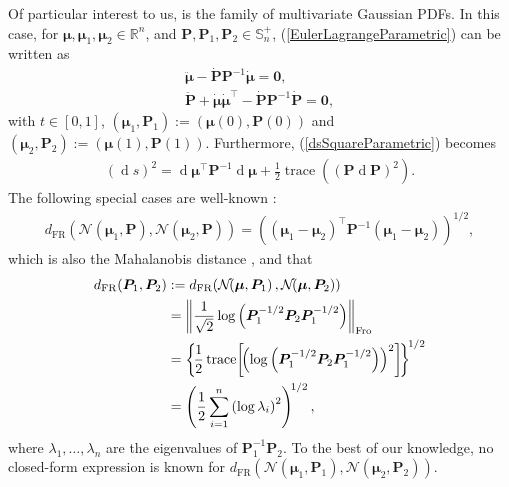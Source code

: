 \documentclass[letterpaper,10pt,twocolumn,conference]{ieeeconf}
\newcommand{\bmu}{\bm{\mu}}
\newcommand{\bbmu}{\bm{\mu}}
\newcommand{\bbP}{{\bm{P}}}
\newcommand{\tr}{\operatorname{trace}}
\newcommand{\dFR}{d_{\mathrm{FR}}}
\newcommand{\differential}{\operatorname{d}}
\begin{document}
Of particular interest to us, is the family of multivariate Gaussian PDFs.
In this case, for $\bmu,\bmu_{1},\bmu_{2}\in\mathbb{R}^{n}$, and $\bbP,\bbP_{1},\bbP_{2} \in \mathbb{S}_{n}^{+}$, (\ref{EulerLagrangeParametric}) can be written as \cite[Theorem 6.1]{Skovgaard1981}
\begin{subequations}
	\begin{align}
\ddot{\bmu} - \dot{\bbP}\bbP^{-1}\dot{\bmu} = \bm{0},\\
\ddot{\bbP} + \dot{\bmu}\dot{\bmu}^{\top} - 	\dot{\bbP}\bbP^{-1}\dot{\bbP} = \bm{0},
\end{align}
\end{subequations}
with $t\in[0,1]$, $(\bbmu_{1},\bbP_{1}) := (\bbmu(0),\bbP(0))$ and $(\bbmu_{2},\bbP_{2}) := (\bbmu(1),\bbP(1))$. Furthermore, (\ref{dsSquareParametric}) becomes
\begin{align}
	(\differential s)^{2} = \differential\bmu^{\top}\bbP^{-1}\differential\bbmu + \frac{1}{2}\tr((\bbP\differential\bbP)^{2}).
\end{align}
The following special cases are well-known \cite{AtkinsonMitchell1981,Skovgaard1981,rao1987differential}:
{\small{\begin{align}
	\dFR(\mathcal{N}\!\!\left(\bmu_{1},\bbP\right),\mathcal{N}\!\!\left(\bmu_{2},\bbP\right)) = \left(\!(\bmu_{1}-\bmu_{2})^{\!\top}\!\bbP^{-1}(\bmu_{1}-\bmu_{2})\!\!\right)^{\!1/2},
	\label{dFRmu1mu2}
\end{align}}}
\!\!which is also the Mahalanobis distance \cite{Mahalanobis1936}, and that
{\small{\begin{align}
	\dFR(\bbP_{1},\bbP_{2}) &:= \dFR(\mathcal{N}\!\!\left(\bmu,\bbP_{1}\right),\mathcal{N}\!\!\left(\bmu,\bbP_{2}\right)) \label{dFRP1P2}\\
	&= \left\Vert \frac{1}{\sqrt{2}}\log\left(\bbP_{1}^{-1/2}\bbP_{2}\bbP_{1}^{-1/2}\right) \right\Vert_{\rm{Fro}}\nonumber\\
	&= \bigg\{\!\frac{1}{2}\tr\!\left[\!\left(\log\left(\bbP_{1}^{-1/2}\bbP_{2}\bbP_{1}^{-1/2}\right)\right)^{2}\right]\!\!\bigg\}^{\!1/2}\label{dFRbetweenCovMatrices}\\
	&= \left(\frac{1}{2}\displaystyle\sum_{i=1}^{n}\left(\log\lambda_{i}\right)^{2}\right)^{\!1/2},\nonumber
\end{align}}}
\!\!where $\lambda_{1},\hdots,\lambda_{n}$ are the eigenvalues of $\bbP_{1}^{-1}\bbP_{2}$. To the best of our knowledge, no closed-form expression is known for $\dFR(\mathcal{N}(\bmu_{1},\bbP_{1}),\mathcal{N}(\bmu_{2},\bbP_{2}))$.
\end{document}
